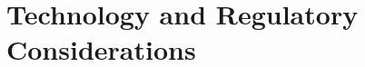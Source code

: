 \documentclass[krantz1,ChapterTOCs]{krantz} %
\theoremstyle{plain}
\theoremstyle{custom}
\theoremstyle{remark}
\numberwithin{equation}{chapter}
\begin{document}
\part{Technology and Regulatory Considerations}




%


\end{document}
